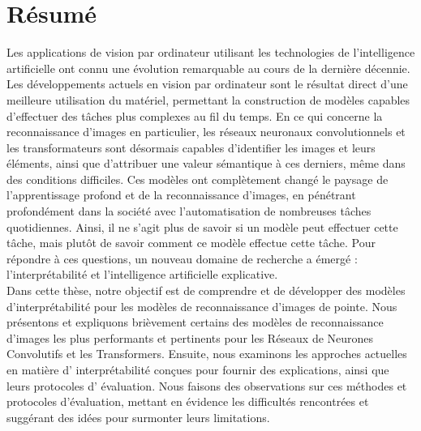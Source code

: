 \chapter*{Résumé}
Les applications de vision par ordinateur utilisant les technologies de l'intelligence artificielle 
ont connu une évolution remarquable au cours de la dernière décennie. Les développements actuels en 
vision par ordinateur sont le résultat direct d'une meilleure utilisation du matériel, permettant 
la construction de modèles capables d'effectuer des tâches plus complexes au fil du temps. En ce 
qui concerne la reconnaissance d'images en particulier, les réseaux neuronaux convolutionnels et 
les transformateurs sont désormais capables d'identifier les images et leurs éléments, ainsi que 
d'attribuer une valeur sémantique à ces derniers, même dans des conditions difficiles. Ces modèles 
ont complètement changé le paysage de l'apprentissage profond et de la reconnaissance d'images, en 
pénétrant profondément dans la société avec l'automatisation de nombreuses tâches quotidiennes. 
Ainsi, il ne s'agit plus de savoir si un modèle peut effectuer cette tâche, mais plutôt de savoir 
comment ce modèle effectue cette tâche. Pour répondre à ces questions, un nouveau domaine de 
recherche a émergé : l'interprétabilité et l'intelligence artificielle explicative.\\

\noindent Dans cette thèse, notre objectif est de comprendre et de développer des modèles 
d'interprétabilité pour les modèles de reconnaissance d'images de pointe. Nous présentons et 
expliquons brièvement certains des modèles de reconnaissance d'images les plus performants et 
pertinents pour les Réseaux de Neurones Convolutifs et les Transformers. Ensuite, nous examinons 
les approches actuelles en matière d' interpr\'etabilit\'e conçues pour fournir des explications, ainsi 
que leurs protocoles d' évaluation. Nous faisons des observations sur ces méthodes et protocoles 
d'évaluation, mettant en évidence les difficultés rencontrées et suggérant des idées pour surmonter 
leurs limitations.\\

